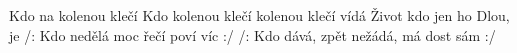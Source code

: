 \begin{TEXT}{Kdo na kolenou klečí}
\SLOKA Kdo  kolenou klečí     \NL
{}  kolenou klečí vídá  
\REFREN  Život   kdo  \NL
jen  ho  \NL
{} Dlou,  je   
\SLOKA /: Kdo nedělá moc řečí poví víc :/
\SLOKA /: Kdo dává, zpět nežádá, má dost sám :/
\end{TEXT}
